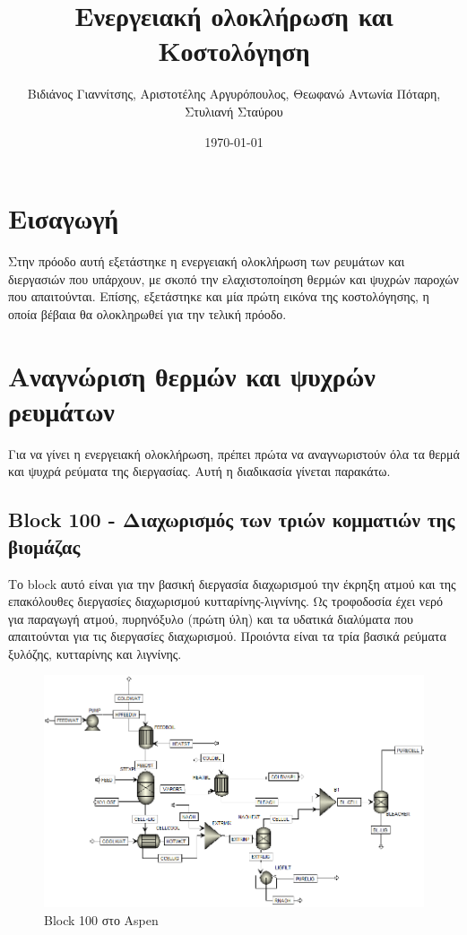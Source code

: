 \documentclass[11pt]{article}
\author{Βιδιάνος Γιαννίτσης, Αριστοτέλης Αργυρόπουλος, Θεωφανώ Αντωνία Πόταρη, Στυλιανή Σταύρου}
\date{\today}
\title{Ενεργειακή ολοκλήρωση και Κοστολόγηση}
\begin{document}
\maketitle
\tableofcontents

\renewcommand{\abstractname}{Περίληψη}
\renewcommand{\tablename}{Πίνακας}
\renewcommand{\figurename}{Σχήμα}
\renewcommand\listingscaption{Κώδικας}

\section{Εισαγωγή}
\label{sec:org43ec364}
Στην πρόοδο αυτή εξετάστηκε η ενεργειακή ολοκλήρωση των ρευμάτων και διεργασιών που υπάρχουν, με σκοπό την ελαχιστοποίηση θερμών και ψυχρών παροχών που απαιτούνται. Επίσης, εξετάστηκε και μία πρώτη εικόνα της κοστολόγησης, η οποία βέβαια θα ολοκληρωθεί για την τελική πρόοδο.

\section{Αναγνώριση θερμών και ψυχρών ρευμάτων}
\label{sec:orgea6316c}
Για να γίνει η ενεργειακή ολοκλήρωση, πρέπει πρώτα να αναγνωριστούν όλα τα θερμά και ψυχρά ρεύματα της διεργασίας. Αυτή η διαδικασία γίνεται παρακάτω.

\subsection{Block 100 - Διαχωρισμός των τριών κομματιών της βιομάζας}
\label{sec:orgfbb855f}
Το block αυτό είναι για την βασική διεργασία διαχωρισμού την έκρηξη ατμού και της επακόλουθες διεργασίες διαχωρισμού κυτταρίνης-λιγνίνης. Ως τροφοδοσία έχει νερό για παραγωγή ατμού, πυρηνόξυλο (πρώτη ύλη) και τα υδατικά διαλύματα που απαιτούνται για τις διεργασίες διαχωρισμού. Προιόντα είναι τα τρία βασικά ρεύματα ξυλόζης, κυτταρίνης και λιγνίνης.

\begin{figure}[htbp]
\centering
\includegraphics[width=.9\linewidth]{Block_100_-_Διαχωρισμός_των_τριών_κομματιών_της_βιομάζας/2023-03-11_15-21-38_screenshot.png}
\caption{Block 100 στο Aspen}
\end{figure}
\end{document}
